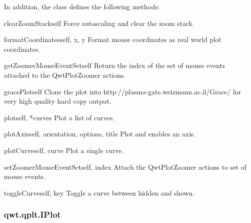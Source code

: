 \documentclass{manual}
\newcommand{\Grace}{\ulink{Grace}
  {http://plasma-gate.weizmann.ac.il/Grace/}}
\begin{document}
In addition, the class  defines the following methods:

\begin{methoddesc}[Plot]{clearZoomStack}{self}
Force autoscaling and clear the zoom stack.
\end{methoddesc}

\begin{methoddesc}[Plot]{formatCoordinates}{self, x, y}
Format mouse coordinates as real world plot coordinates.
\end{methoddesc}

\begin{methoddesc}[Plot]{getZoomerMouseEventSet}{self}
Return the index of the set of mouse events attached to the QwtPlotZoomer
actions.
\end{methoddesc}

\begin{methoddesc}[Plot]{gracePlot}{self}
Clone the plot into \Grace{} for very high quality hard copy output.
\end{methoddesc}

\begin{methoddesc}[Plot]{plot}{self, *curves}
Plot a list of curves.
\end{methoddesc}

\begin{methoddesc}[Plot]{plotAxis}{self, orientation, options, title}
Plot and enables an axis.
\end{methoddesc}

\begin{methoddesc}[Plot]{plotCurve}{self, curve}
Plot a single curve.
\end{methoddesc}

\begin{methoddesc}[Plot]{setZoomerMouseEventSet}{self, index}
Attach the QwtPlotZoomer actions to set of mouse events.
\end{methoddesc}

\begin{methoddesc}[Plot]{toggleCurve}{self, key}
Toggle a curve between hidden and shown.
\end{methoddesc}

\subsubsection{qwt.qplt.IPlot \label{intro-qplt-iplot}}
\end{document}
